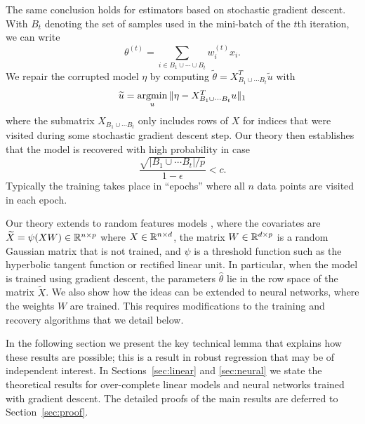 The same conclusion holds for estimators based on stochastic gradient descent. With $B_t$ denoting the set of samples used in the mini-batch of the $t$th iteration, we can write
\begin{equation}
  \theta^{(t)} = \sum_{i\in B_1\cup\cdots\cup B_t} w_i^{(t)} x_i.
\end{equation}
We repair the corrupted model $\eta$ by computing $\tilde \theta = X^T_{B_1\cup \cdots B_t} \tilde u$ with
\begin{equation}
  \tilde u = \argmin_u \| \eta - X^T_{B_1\cup \cdots B_t} u\|_1
\end{equation}
where the submatrix $X_{B_1\cup\cdots B_t}$ only includes rows of $X$ for indices that were visited during some stochastic
gradient descent step. Our theory then establishes that the model is recovered with high probability in case
\begin{equation}
  \frac{\sqrt{{|B_1 \cup \cdots B_t|}/{p}}}{1-\epsilon} < c.
\end{equation}
Typically the training takes place in ``epochs'' where all $n$ data points are visited in each epoch.

 Our theory extends to random features models \citep{rahimi2008}, where the covariates are $\widetilde X = \psi(X W)\in \mathbb{R}^{n\times p}$ where $X\in\mathbb{R}^{n\times d}$, the matrix $W\in\mathbb{R}^{d\times p}$ is a random Gaussian matrix that is not trained, and $\psi$ is a threshold function such as the hyperbolic tangent function or rectified linear unit. In particular, when the model is trained using gradient descent, the parameters $\hat\theta$ lie in the row
space of the matrix $\tilde X$. We also show how the ideas can be extended to neural networks, where the weights $W$ are trained. This requires modifications to the training and recovery algorithms that we detail below.

In the following section we present the key technical lemma that explains how these results are possible; this is a result in robust regression that may be of independent interest. In Sections~\ref{sec:linear} and \ref{sec:neural} we state the theoretical results for over-complete linear models and neural networks trained with gradient descent. The detailed proofs of the main results are deferred to Section~\ref{sec:proof}.
